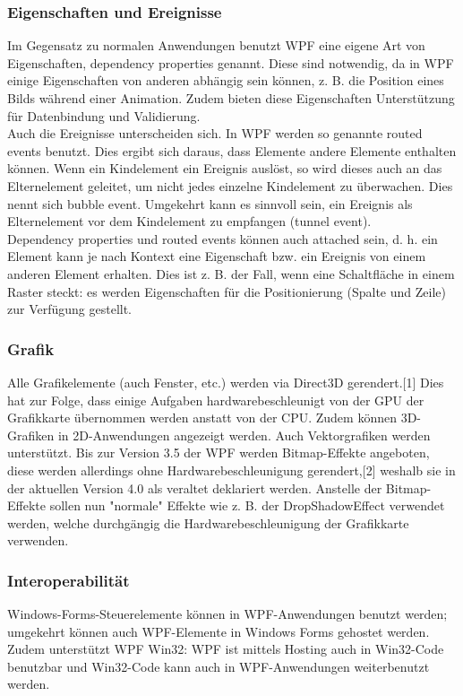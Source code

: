 \documentclass[10pt]{article}
\begin{document}
\subsubsection{Eigenschaften und Ereignisse}
Im Gegensatz zu normalen Anwendungen benutzt WPF eine eigene Art von Eigenschaften, dependency properties genannt. Diese sind notwendig, da in WPF einige Eigenschaften von anderen abhängig sein können, z. B. die Position eines Bilds während einer Animation. Zudem bieten diese Eigenschaften Unterstützung für Datenbindung und Validierung. \\
Auch die Ereignisse unterscheiden sich. In WPF werden so genannte routed events benutzt. Dies ergibt sich daraus, dass Elemente andere Elemente enthalten können. Wenn ein Kindelement ein Ereignis auslöst, so wird dieses auch an das Elternelement geleitet, um nicht jedes einzelne Kindelement zu überwachen. Dies nennt sich bubble event. Umgekehrt kann es sinnvoll sein, ein Ereignis als Elternelement vor dem Kindelement zu empfangen (tunnel event). \\
Dependency properties und routed events können auch attached sein, d. h. ein Element kann je nach Kontext eine Eigenschaft bzw. ein Ereignis von einem anderen Element erhalten. Dies ist z. B. der Fall, wenn eine Schaltfläche in einem Raster steckt: es werden Eigenschaften für die Positionierung (Spalte und Zeile) zur Verfügung gestellt.
\subsubsection{Grafik}
Alle Grafikelemente (auch Fenster, etc.) werden via Direct3D gerendert.[1] Dies hat zur Folge, dass einige Aufgaben hardwarebeschleunigt von der GPU der Grafikkarte übernommen werden anstatt von der CPU. Zudem können 3D-Grafiken in 2D-Anwendungen angezeigt werden. Auch Vektorgrafiken werden unterstützt. Bis zur Version 3.5 der WPF werden Bitmap-Effekte angeboten, diese werden allerdings ohne Hardwarebeschleunigung gerendert,[2] weshalb sie in der aktuellen Version 4.0 als veraltet deklariert werden. Anstelle der Bitmap-Effekte sollen nun "normale" Effekte wie z. B. der DropShadowEffect verwendet werden, welche durchgängig die Hardwarebeschleunigung der Grafikkarte verwenden.
\subsubsection{Interoperabilität}
Windows-Forms-Steuerelemente können in WPF-Anwendungen benutzt werden; umgekehrt können auch WPF-Elemente in Windows Forms gehostet werden. \\
Zudem unterstützt WPF Win32: WPF ist mittels Hosting auch in Win32-Code benutzbar und Win32-Code kann auch in WPF-Anwendungen weiterbenutzt werden.
\end{document}
